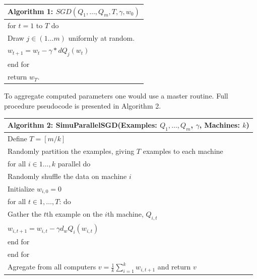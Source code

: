 \begin{table}[h]
	\begin{flushleft}
		\begin{tabular}{l}
			Algorithm 1: $SGD({Q_1, \dots, Q_m}, T, \gamma, w_0)$\\
			\hline
			for $t = 1$ to $T$ do\\
			\enskip\enskip	Draw $j \in (1 \dots m)$ uniformly at random.\\
			\enskip\enskip	$w_{t+1}=w_t-\gamma*dQ_j(w_t)$\\
			end for\\
			return $w_T$.\\
		\end{tabular}
	\end{flushleft}
\end{table}

To aggregate computed parameters one would use a master routine. Full procedure pseudocode is presented in Algorithm 2.

\begin{table}[h]
	\begin{flushleft}
		\begin{tabular}{l}
			Algorithm 2: SimuParallelSGD(Examples: ${Q_1, \dots, Q_m}$, $\gamma$, Machines: $k$)\\
			\hline
			Define $T=[m/k]$\\
			Randomly partition the examples, giving $T$ examples to each machine\\
			for all $i \in {1 \dots, k}$ parallel do\\
			\enskip\enskip Randomly shuffle the data on machine $i$\\
			\enskip\enskip Initialize $w_{i,0}=0$\\
			\enskip\enskip for all $t \in {1, \dots, T}$: do\\
			\enskip\enskip\enskip\enskip Gather the $t$th example on the $i$th machine, $Q_{i,t}$\\
			\enskip\enskip\enskip\enskip $w_{i,t+1} = w_{i,t}-\gamma d_w Q_i(w_{i,t})$\\
			\enskip\enskip\enskip\enskip end for\\
			\enskip\enskip end for\\
			Agregate from all computers $v=\frac{1}{k} \sum\limits_{i=1}^{k} w_{i,t+1}$ and return $v$\\
		\end{tabular}
	\end{flushleft}
\end{table}

